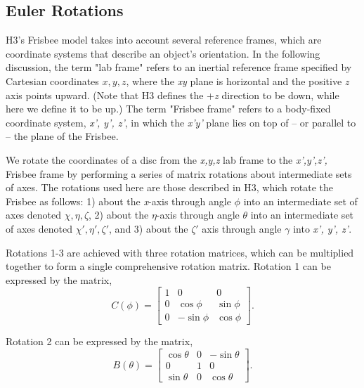 \documentclass[a4paper,12pt, oneside]{article}
\begin{document}
\subsection{Euler Rotations} 
H3's Frisbee model takes into account several reference frames, which are coordinate systems that describe an object's orientation.  In the following discussion, the term "lab frame" refers to an inertial reference frame specified by Cartesian coordinates $x,y,z$, where the \textit{xy} plane is horizontal and the positive \textit{z} axis points upward.  (Note that H3 defines the +\textit{z} direction to be down, while here we define it to be up.) The term "Frisbee frame" refers to a body-fixed coordinate system, \textit{x', y', z'}, in which the \textit{x'y'} plane lies on top of -- or parallel to -- the plane of the Frisbee. 

We rotate the coordinates of a disc from the \textit{x,y,z} lab frame to the \textit{x',y',z',} Frisbee frame by performing a series of matrix rotations about intermediate sets of axes.  The rotations used here are those described in H3, which rotate the Frisbee as follows: 1) about the \textit{x}-axis through angle $\phi$ into an intermediate set of axes denoted $\chi,\eta,\zeta$, 2) about the $\eta$-axis through angle $\theta$ into an intermediate set of axes denoted $\chi',\eta',\zeta'$, and 3) about the $\zeta'$ axis through angle $\gamma$ into \textit{x', y', z'}.

Rotations 1-3 are achieved with three rotation matrices, which can be multiplied together to form a single comprehensive rotation matrix. Rotation 1 can be expressed by the matrix,
\begin{equation*}
C(\phi)=\begin{bmatrix}
1 & 0 & 0 \\
0 & \cos\phi & \sin\phi \\
0 & -\sin\phi & \cos\phi
\end{bmatrix}.
\end{equation*}

Rotation 2 can be expressed by the matrix, 
\begin{equation*}
B(\theta)=\begin{bmatrix}
\cos\theta & 0 & -\sin\theta \\
0 & 1 & 0 \\
\sin\theta & 0 & \cos\theta
\end{bmatrix}.
\end{equation*}
\end{document}
